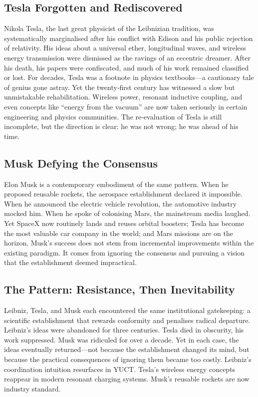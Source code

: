 \documentclass[12pt,a4paper]{article}
\begin{document}
	\subsection{Tesla Forgotten and Rediscovered}
	
	Nikola Tesla, the last great physicist of the Leibnizian tradition, was systematically marginalised after his conflict with Edison and his public rejection of relativity. His ideas about a universal ether, longitudinal waves, and wireless energy transmission were dismissed as the ravings of an eccentric dreamer. After his death, his papers were confiscated, and much of his work remained classified or lost. For decades, Tesla was a footnote in physics textbooks—a cautionary tale of genius gone astray. Yet the twenty‑first century has witnessed a slow but unmistakable rehabilitation. Wireless power, resonant inductive coupling, and even concepts like “energy from the vacuum” are now taken seriously in certain engineering and physics communities. The re‑evaluation of Tesla is still incomplete, but the direction is clear: he was not wrong; he was ahead of his time.
	
	\subsection{Musk Defying the Consensus}
	
	Elon Musk is a contemporary embodiment of the same pattern. When he proposed reusable rockets, the aerospace establishment declared it impossible. When he announced the electric vehicle revolution, the automotive industry mocked him. When he spoke of colonising Mars, the mainstream media laughed. Yet SpaceX now routinely lands and reuses orbital boosters; Tesla has become the most valuable car company in the world; and Mars missions are on the horizon. Musk’s success does not stem from incremental improvements within the existing paradigm. It comes from ignoring the consensus and pursuing a vision that the establishment deemed impractical.
	
	\subsection{The Pattern: Resistance, Then Inevitability}
	
	Leibniz, Tesla, and Musk each encountered the same institutional gatekeeping: a scientific establishment that rewards conformity and penalises radical departure. Leibniz’s ideas were abandoned for three centuries. Tesla died in obscurity, his work suppressed. Musk was ridiculed for over a decade. Yet in each case, the ideas eventually returned—not because the establishment changed its mind, but because the practical consequences of ignoring them became too costly. Leibniz’s coordination intuition resurfaces in YUCT. Tesla’s wireless energy concepts reappear in modern resonant charging systems. Musk’s reusable rockets are now industry standard.
	
\end{document}
